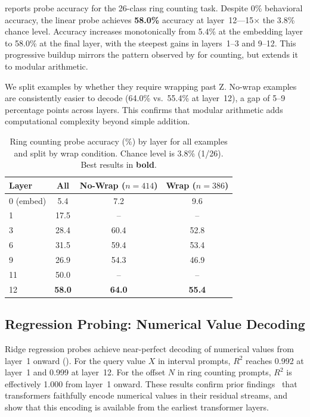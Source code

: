  reports probe accuracy for the 26-class ring counting task. Despite 0\% behavioral accuracy, the linear probe achieves \textbf{58.0\%} accuracy at layer~12---15$\times$ the 3.8\% chance level. Accuracy increases monotonically from 5.4\% at the embedding layer to 58.0\% at the final layer, with the steepest gains in layers~1--3 and 9--12. This progressive buildup mirrors the pattern observed by \citet{hasani2026mechanistic} for counting, but extends it to modular arithmetic.

 We split examples by whether they require wrapping past Z. No-wrap examples are consistently easier to decode (64.0\% vs.\ 55.4\% at layer~12), a gap of 5--9 percentage points across layers. This confirms that modular arithmetic adds computational complexity beyond simple addition.

\begin{table}[t]
\centering
\caption{Ring counting probe accuracy (\%) by layer for all examples and split by wrap condition. Chance level is 3.8\% (1/26). Best results in \textbf{bold}.}
\label{tab:ring}
\begin{tabular}{@{}lccc@{}}
\toprule
\textbf{Layer} & \textbf{All} & \textbf{No-Wrap ($n{=}414$)} & \textbf{Wrap ($n{=}386$)} \\
\midrule
0 (embed) & 5.4 & 7.2 & 9.6 \\
1 & 17.5 & -- & -- \\
3 & 28.4 & 60.4 & 52.8 \\
6 & 31.5 & 59.4 & 53.4 \\
9 & 26.9 & 54.3 & 46.9 \\
11 & 50.0 & -- & -- \\
12 & \textbf{58.0} & \textbf{64.0} & \textbf{55.4} \\
\bottomrule
\end{tabular}
\end{table}

\subsection{Regression Probing: Numerical Value Decoding}
\label{sec:regression}

Ridge regression probes achieve near-perfect decoding of numerical values from layer~1 onward (). For the query value $X$ in interval prompts, $R^2$ reaches 0.992 at layer~1 and 0.999 at layer~12. For the offset $N$ in ring counting prompts, $R^2$ is effectively 1.000 from layer~1 onward. These results confirm prior findings~\citep{levy2024language} that transformers faithfully encode numerical values in their residual streams, and show that this encoding is available from the earliest transformer layers.

